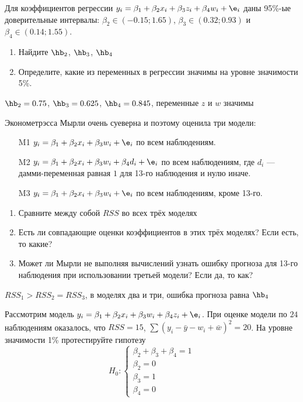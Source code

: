 \documentclass[pdftex,11pt,openany]{book}\usepackage[]{graphicx}\usepackage[]{color}
\begin{document}
\begin{problem}
 Для коэффициентов регрессии $y_i = \beta_1 + \beta_2 x_i + \beta_3 z_i  + \beta_4 w_i + \e_i$ даны 95\%-ые
доверительные интервалы: $\beta_2 \in (-0.15;1.65)$, $\beta_3 \in (0.32;0.93)$ и $\beta_4 \in (0.14; 1.55)$.

\begin{enumerate}
\item Найдите $\hb_2$, $\hb_3$, $\hb_4$
\item Определите, какие из переменных в регрессии значимы на уровне значимости 5\%.
\end{enumerate}
\end{problem}
 
\begin{solution}
 $\hb_2=0.75$, $\hb_3=0.625$, $\hb_4= 0.845$, переменные $z$ и $w$ значимы 
\end{solution}

\begin{problem}
 Эконометрэсса Мырли очень суеверна и поэтому оценила три модели:
\begin{enumerate}
\item[M1] $y_i=\beta_1 + \beta_2 x_i + \beta_3 w_i + \e_i$ по всем наблюдениям.
\item[M2] $y_i=\beta_1 + \beta_2 x_i + \beta_3 w_i + \beta_4 d_i + \e_i$ по всем наблюдениям, где $d_i$ --- дамми-переменная равная $1$ для 13-го наблюдения и нулю иначе.
\item[M3] $y_i=\beta_1 + \beta_2 x_i + \beta_3 w_i + \e_i$ по всем наблюдениям, кроме 13-го.
\end{enumerate}

\begin{enumerate}
\item Сравните между собой $RSS$ во всех трёх моделях
\item Есть ли совпадающие оценки коэффициентов в этих трёх моделях? Если есть, то какие?
\item Может ли Мырли не выполняя вычислений узнать ошибку прогноза для 13-го наблюдения при использовании третьей модели? Если да, то как?
\end{enumerate}
\end{problem}
 
\begin{solution}
$RSS_1 > RSS_2 = RSS_3$, в моделях два и три, ошибка прогноза равна $\hb_4$
\end{solution}

\begin{problem}
 Рассмотрим модель $y_i = \beta_1+ \beta_2 x_i + \beta_3 w_i +\beta_4 z_i + \e_i$.  При оценке модели по $24$ наблюдениям оказалось, что $RSS=15$, $\sum (y_i-\bar{y}-w_i+\bar{w})^2=20$. На уровне значимости 1\% протестируйте гипотезу 
\[
H_0:
\begin{cases}
\beta_2+\beta_3+\beta_4=1 \\
\beta_2=0 \\
\beta_3=1 \\
\beta_4=0
\end{cases}
\]
\end{problem}
\end{document}
